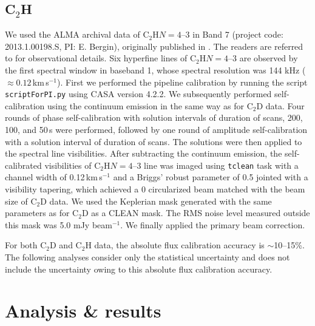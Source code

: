 \documentclass[linenumbers, twocolumn, times]{aastex631}
\newcommand{\CCH}{C$_2$H\xspace}
\newcommand{\CCD}{C$_2$D\xspace}
\begin{document}
\subsection{C$_2$H}
We used the ALMA archival data of \CCH $N=4$--3 in Band 7 (project code: 2013.1.00198.S, PI: E. Bergin), originally published in \citet{Bergin2016}. The readers are referred to \citet{Bergin2016} for observational details. Six hyperfine lines of \CCH $N=4$--3 are observed by the first spectral window in baseband 1, whose spectral resolution was 144 kHz (${\approx}0.12$\,km\,s$^{-1}$). First we performed the pipeline calibration by running the script \texttt{scriptForPI.py} using CASA version 4.2.2. We subsequently performed self-calibration using the continuum emission in the same way as for \CCD data. Four rounds of phase self-calibration with solution intervals of duration of scans, 200, 100, and 50\,s were performed, followed by one round of amplitude self-calibration with a solution interval of duration of scans. The solutions were then applied to the spectral line visibilities. After subtracting the continuum emission, the self-calibrated visibilities of \CCH $N=4$--3 line was imaged using \texttt{tclean} task with a channel width of 0.12\,km\,s$^{-1}$ and a Briggs' robust parameter of 0.5 jointed with a visibility tapering, which achieved a 0 circularized beam matched with the beam size of \CCD data. We used the Keplerian mask generated with the same parameters as for \CCD as a CLEAN mask. The RMS noise level measured outside this mask was 5.0 mJy beam$^{-1}$. We finally applied the primary beam correction.

For both \CCD and \CCH data, the absolute flux calibration accuracy is ${\sim}$10--15\%. The following analyses consider only the statistical uncertainty and does not include the uncertainty owing to this absolute flux calibration accuracy.


\section{Analysis \& results} \label{sec:analysis}
\end{document}
